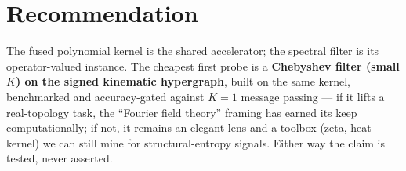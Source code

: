 \documentclass[11pt]{article}
\begin{document}
\section{Recommendation}
The fused polynomial kernel is the shared accelerator; the spectral filter is its operator-valued instance.
The cheapest first probe is a \textbf{Chebyshev filter (small $K$) on the signed kinematic hypergraph}, built on
the same kernel, benchmarked and accuracy-gated against $K{=}1$ message passing --- if it lifts a real-topology
task, the ``Fourier field theory'' framing has earned its keep computationally; if not, it remains an elegant
lens and a toolbox (zeta, heat kernel) we can still mine for structural-entropy signals. Either way the claim is
tested, never asserted.
\end{document}
